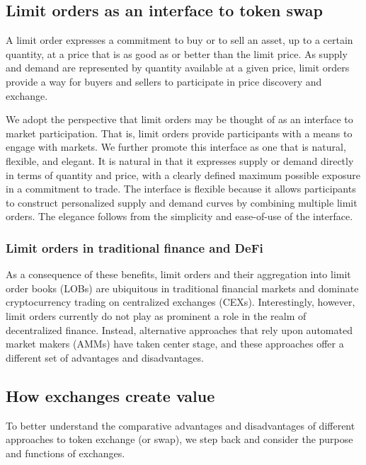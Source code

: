 \documentclass[11pt, reqno]{amsart}
\theoremstyle{definition}
\theoremstyle{remark}
\begin{document}
\subsection{Limit orders as an interface to token swap}
A limit order expresses a commitment to buy or to sell an asset, up to
a certain quantity, at a price that is as good as or better than the limit price.
As supply and demand are represented by quantity available at a given price,
limit orders provide a way for buyers and sellers to participate in price
discovery and exchange.

We adopt the perspective that limit orders may be thought of as an interface
to market participation. That is, limit orders provide participants with a
means to engage with markets. We further promote this interface as one that
is natural, flexible, and elegant. It is natural in that it expresses
supply or demand directly in terms of quantity and price, with a clearly
defined maximum possible exposure in a commitment to trade. The interface is
flexible because it allows participants to construct personalized supply and
demand curves by combining multiple limit orders. The elegance follows from the
simplicity and ease-of-use of the interface.

\subsubsection{Limit orders in traditional finance and DeFi}
As a consequence of these benefits, limit orders and their aggregation into
limit order books (LOBs) are ubiquitous in traditional financial markets
and dominate cryptocurrency trading on centralized exchanges (CEXs).
Interestingly, however, limit orders currently do not play as prominent a role
in the realm of decentralized finance. Instead, alternative approaches that
rely upon automated market makers (AMMs) have taken center stage, and these
approaches offer a different set of advantages and disadvantages.

\subsection{How exchanges create value}
To better understand the comparative advantages and disadvantages of different
approaches to token exchange (or swap), we step back and consider the purpose and
functions of exchanges.
\end{document}
